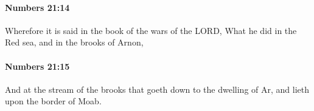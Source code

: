 		\paragraph{Numbers 21:14} %
			\label{NUMBERS-21-14}

			Wherefore it is said in the book of the wars of the LORD, What he did in the Red sea, and in the brooks of Arnon,


		\paragraph{Numbers 21:15} %
			\label{NUMBERS-21-15}

			And at the stream of the brooks that goeth down to the dwelling of Ar, and lieth upon the border of Moab.


